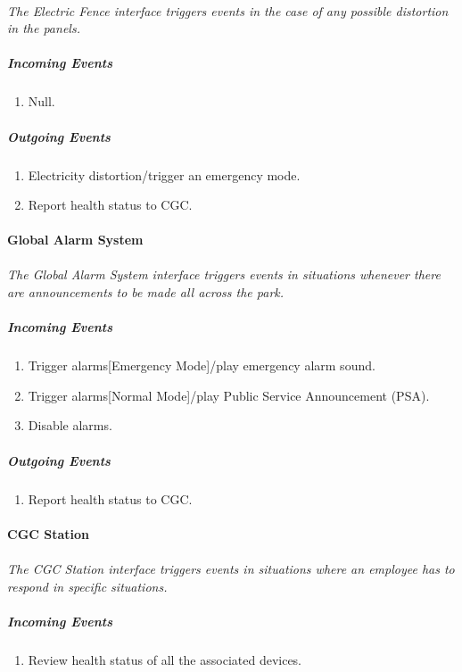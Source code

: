 \documentclass[12pt]{article}
\begin{document}
    \paragraph{}\textit{The Electric Fence interface triggers events in the case of any possible distortion in the panels. }
        \subparagraph{Incoming Events}
        \begin{enumerate}
            \item Null.
        \end{enumerate}
                
        \subparagraph{Outgoing Events}
        \begin{enumerate}
            \item Electricity distortion/trigger an emergency mode.
            \item Report health status to CGC. 
        \end{enumerate}

    \paragraph{Global Alarm System}
    \paragraph{}\textit{The Global Alarm System interface triggers events in situations whenever 
    there are announcements to be made all across the park. }
        \subparagraph{Incoming Events}
        \begin{enumerate}
            \item Trigger alarms[Emergency Mode]/play emergency alarm sound.
            \item Trigger alarms[Normal Mode]/play Public Service Announcement (PSA).
            \item Disable alarms.
        \end{enumerate}
                
        \subparagraph{Outgoing Events}
        \begin{enumerate}
            \item Report health status to CGC.
        \end{enumerate}

    \paragraph{CGC Station}
    \paragraph{}\textit{The CGC Station interface triggers events in situations where an employee has to respond in specific situations. }
        \subparagraph{Incoming Events}
        \begin{enumerate}
            \item Review health status of all the associated devices.
        \end{enumerate}
                
\end{document}
